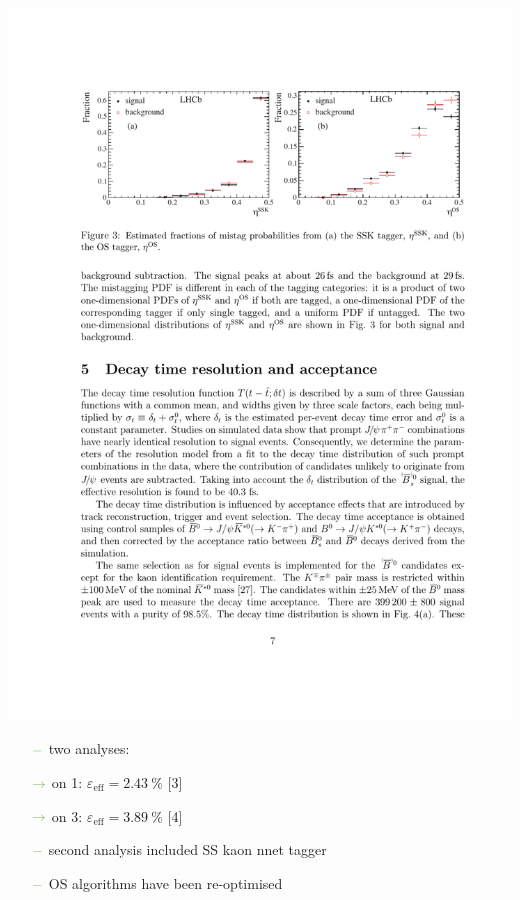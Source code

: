{\begin{minipage}{0.474\boxwidth}
\begin{itemize}
\vspace{-1.7em}
\begin{center}
\includegraphics[width=0.315\boxwidth]{figures/Jpsipipi_SSK.pdf}
\end{center}
\vspace{-2.7em}

	\begin{itemize}
	\setlength\itemsep{0.01em}
	\setlength{\itemindent}{-.11in}
	\item[${\color{tu_gruen}-}$] two analyses:
	\setlength{\itemindent}{.05in}
	\item[${\color{tu_gruen}\rightarrow}$] on \SI{1}{\invfb}: $\varepsilon_\text{eff}=\SI{2.43}{\%}$ [3] 
	\item[${\color{tu_gruen}\rightarrow}$] on  \SI{3}{\invfb}: $\varepsilon_\text{eff}=\SI{3.89}{\%}$ [4]
	\setlength{\itemindent}{-.11in}
	\item[${\color{tu_gruen}-}$] second analysis included SS kaon nnet tagger
	\item[${\color{tu_gruen}-}$] OS algorithms have been re-optimised
	\end{itemize}
	

\end{itemize}
\end{minipage}}
